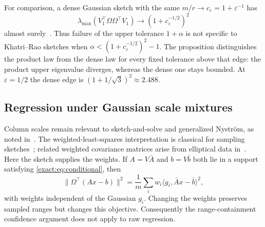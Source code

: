 \documentclass[11pt,a4paper]{article}
\theoremstyle{definition}\newtheorem{definition}[theorem]{Definition}
\theoremstyle{remark}\newtheorem{remark}[theorem]{Remark}
\numberwithin{equation}{section}
\newcommand{\norm}[1]{\lVert#1\rVert}\newcommand{\ip}[2]{\langle#1,#2\rangle}
\begin{document}
For comparison, a dense Gaussian sketch with the same
$m/r\to c_\varepsilon=1+\varepsilon^{-1}$ has
\[
 \lambda_{\max}(V_1^\top\Omega\Omega^\top V_1)
 \longrightarrow (1+c_\varepsilon^{-1/2})^2
\]
almost surely~\cite{YBK1988}. Thus failure of the upper tolerance
$1+\alpha$ is not specific to Khatri--Rao sketches when
$\alpha<(1+c_\varepsilon^{-1/2})^2-1$. The proposition distinguishes
the product law from the dense law for every fixed tolerance above
that edge: the product upper eigenvalue diverges, whereas the dense
one stays bounded. At $\varepsilon=1/2$ the dense edge is
$(1+1/\sqrt3)^2\approx2.488$.

\subsection{Regression under Gaussian scale mixtures}
\label{weighted:sec}
Column scales remain relevant to sketch-and-solve and generalized
Nystr\"om, as noted in~\cite[Section~5.4]{CEMT2025}.
The weighted-least-squares interpretation is classical for sampling
sketches~\cite{MaMahoneyYu2015}; related weighted covariance matrices
arise from elliptical data in~\cite{DobribanLiu2019}.
Here the sketch supplies the weights. If $A=V\bar A$ and $b=V\bar b$
both lie in a support satisfying \eqref{exact:eq:conditional}, then
\[
 \norm{\Omega^\top(Ax-b)}^2
 =\frac1m\sum_iw_i\ip{g_i}{\bar A x-\bar b}^2,
\]
with weights independent of the Gaussian $g_i$. Changing the weights
preserves sampled ranges but changes this objective. Consequently the
range-containment confidence argument does not apply to raw regression.
\end{document}
